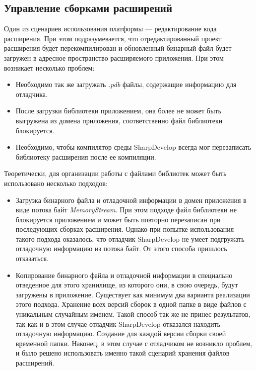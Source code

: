  
\subsection{Управление сборками расширений}
\label{sec:dll_manip}

Один из сценариев использования платформы --- редактирование кода расширения. При этом подразумевается, что отредактированный проект расширения будет перекомпилирован и обновленный бинарный файл будет загружен в адресное пространство расширяемого приложения. При этом возникает несколько проблем:

\begin{itemize}
  \item Необходимо так же загружать {\it .pdb} файлы, содержащие информацию для отладчика.
  \item После загрузки библиотеки приложением, она более не может быть выгружена из домена приложения, соответственно файл библиотеки блокируется.
  \item Необходимо, чтобы компилятор среды SharpDevelop всегда мог перезаписать библиотеку расширения после ее компиляции.
\end{itemize}

Теоретически, для организации работы с файлами библиотек может быть использовано несколько подходов:

\begin{itemize}
  \item Загрузка бинарного файла и отладочной информации в домен приложения в виде потока байт {\it MemoryStream}.
  При этом подходе файл библиотеки не блокируется приложением и может быть повторно перезаписан при последующих сборках расширения. Однако при попытке использования такого подхода оказалось, что отладчик SharpDevelop не умеет подгружать отладочную информацию из потока байт. От этого способа пришлось отказаться.
  \item Копирование бинарного файла и отладочной информации в специально отведенное для этого хранилище, из которого они, в свою очередь, будут загружены в приложение.
  Существует как минимум два варианта реализации этого подхода.
    \subitem Хранение всех версий сборок в одной папке в виде файлов с уникальным случайным именем. Такой способ так же не принес результатов, так как и в этом случае отладчик SharpDevelop отказался находить отладочную информацию.
	\subitem Создание для каждой версии сборки своей временной папки. Наконец, в этом случае с отладчиком не возникло проблем, и было решено использовать именно такой сценарий хранения файлов расширений.
\end{itemize}

